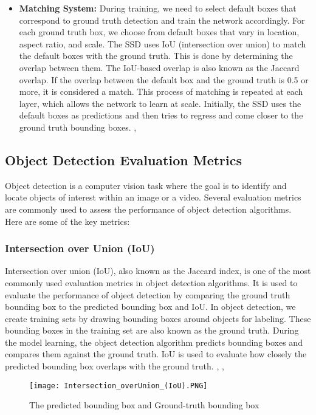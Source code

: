 \begin{itemize}
    \item \textbf{Matching System: } During training, we need to select default boxes that correspond to ground truth detection and train the network accordingly. For each ground truth box, we choose from default boxes that vary in location, aspect ratio, and scale.  The SSD uses IoU (intersection over union) to match the default boxes with the ground truth. This is done by determining the overlap between them. The IoU-based overlap is also known as the Jaccard overlap. If the overlap between the default box and the ground truth is 0.5 or more, it is considered a match. This process of matching is repeated at each layer, which allows the network to learn at scale. Initially, the SSD uses the default boxes as predictions and then tries to regress and come closer to the ground truth bounding boxes. \cite{ansari2020building}, \cite{liu2016ssd}

\end{itemize}

\subsection{Object Detection Evaluation Metrics}
Object detection is a computer vision task where the goal is to identify and locate objects of interest within an image or a video. Several evaluation metrics are commonly used to assess the performance of object detection algorithms. Here are some of the key metrics:
\subsubsection{Intersection over Union (IoU)}
Intersection over union (IoU), also known as the Jaccard index, is one of the most commonly used evaluation metrics in object detection algorithms. It is used to evaluate the performance of object detection by comparing the ground truth bounding box to the predicted bounding box and IoU.
In object detection, we create training sets by drawing bounding boxes around objects for labeling. These bounding boxes in the training set are also known as the ground truth. During the model learning, the object detection algorithm predicts bounding boxes and compares them against the ground truth. IoU is used to evaluate how closely the predicted bounding box overlaps with the ground truth. \cite{ansari2020building}, \cite{bfortuner_mlglossary}, \cite{liu2016ssd}

\begin{figure}[H]
    \centering
    \texttt{[image: Intersection\_overUnion\_(IoU).PNG]}
    \caption{The predicted bounding box and Ground-truth bounding box}
    \label{fig:PBGTB}
\end{figure}

